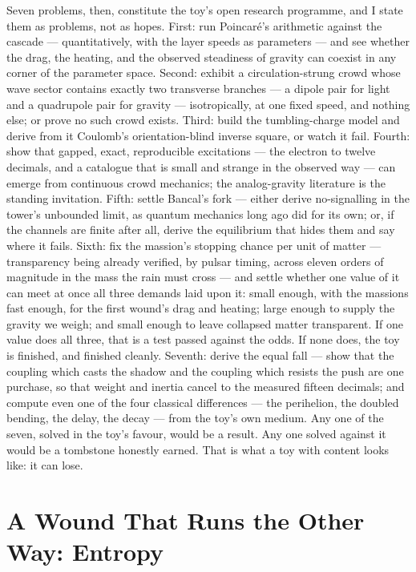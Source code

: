\documentclass[fontsize=11pt,paper=a4,pagesize=auto,parskip=half-]{scrbook}
\begin{document}
Seven problems, then, constitute the toy's open research programme, and I state them as problems, not as hopes. First: run Poincar\'e's arithmetic against the cascade --- quantitatively, with the layer speeds as parameters --- and see whether the drag, the heating, and the observed steadiness of gravity can coexist in any corner of the parameter space. Second: exhibit a circulation-strung crowd whose wave sector contains exactly two transverse branches --- a dipole pair for light and a quadrupole pair for gravity --- isotropically, at one fixed speed, and nothing else; or prove no such crowd exists. Third: build the tumbling-charge model and derive from it Coulomb's orientation-blind inverse square, or watch it fail. Fourth: show that gapped, exact, reproducible excitations --- the electron to twelve decimals, and a catalogue that is small and strange in the observed way --- can emerge from continuous crowd mechanics; the analog-gravity literature is the standing invitation. Fifth: settle Bancal's fork --- either derive no-signalling in the tower's unbounded limit, as quantum mechanics long ago did for its own; or, if the channels are finite after all, derive the equilibrium that hides them and say where it fails. Sixth: fix the massion's stopping chance per unit of matter --- transparency being already verified, by pulsar timing, across eleven orders of magnitude in the mass the rain must cross --- and settle whether one value of it can meet at once all three demands laid upon it: small enough, with the massions fast enough, for the first wound's drag and heating; large enough to supply the gravity we weigh; and small enough to leave collapsed matter transparent. If one value does all three, that is a test passed against the odds. If none does, the toy is finished, and finished cleanly. Seventh: derive the equal fall --- show that the coupling which casts the shadow and the coupling which resists the push are one purchase, so that weight and inertia cancel to the measured fifteen decimals; and compute even one of the four classical differences --- the perihelion, the doubled bending, the delay, the decay --- from the toy's own medium. Any one of the seven, solved in the toy's favour, would be a result. Any one solved against it would be a tombstone honestly earned. That is what a toy with content looks like: it can lose.

\section{A Wound That Runs the Other Way: Entropy}
\end{document}
